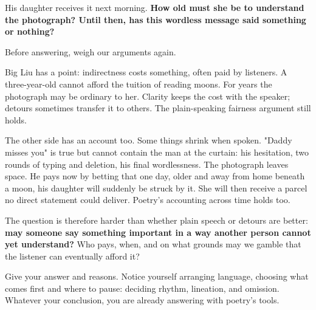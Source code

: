 His daughter receives it next morning. \textbf{How old must she be to understand the photograph? Until then, has this wordless message said something or nothing?}

Before answering, weigh our arguments again.

Big Liu has a point: indirectness costs something, often paid by listeners. A three-year-old cannot afford the tuition of reading moons. For years the photograph may be ordinary to her. Clarity keeps the cost with the speaker; detours sometimes transfer it to others. The plain-speaking fairness argument still holds.

The other side has an account too. Some things shrink when spoken. "Daddy misses you" is true but cannot contain the man at the curtain: his hesitation, two rounds of typing and deletion, his final wordlessness. The photograph leaves space. He pays now by betting that one day, older and away from home beneath a moon, his daughter will suddenly be struck by it. She will then receive a parcel no direct statement could deliver. Poetry's accounting across time holds too.

The question is therefore harder than whether plain speech or detours are better: \textbf{may someone say something important in a way another person cannot yet understand?} Who pays, when, and on what grounds may we gamble that the listener can eventually afford it?

Give your answer and reasons. Notice yourself arranging language, choosing what comes first and where to pause: deciding rhythm, lineation, and omission. Whatever your conclusion, you are already answering with poetry's tools.

